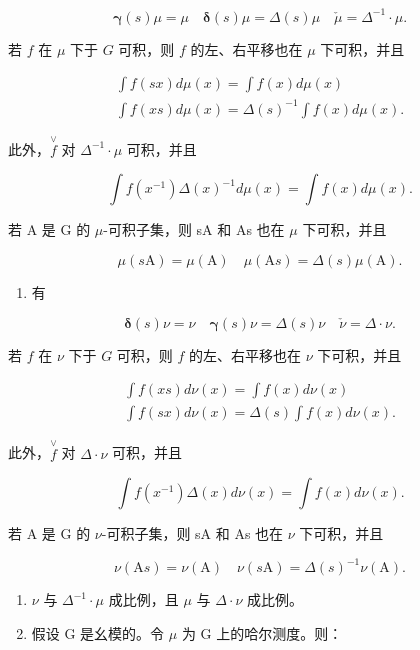 \[
\boldsymbol {\gamma} (s) \mu = \mu \quad \boldsymbol {\delta} (s) \mu = \Delta (s) \mu \quad \check {\mu} = \Delta^ {- 1} \cdot \mu .\tag{20}
\]

若 \(f\) 在 \(\mu\) 下于 \(G\) 可积，则 \(f\) 的左、右平移也在 \(\mu\) 下可积，并且

\[
\begin{array}{l} \int f (s x) d \mu (x) = \int f (x) d \mu (x) \\ \int f (x s) d \mu (x) = \Delta (s) ^ {- 1} \int f (x) d \mu (x). \end{array}\tag{21}
\]

此外，\(\stackrel{\vee}{f}\) 对 \(\Delta^{-1} \cdot \mu\) 可积，并且

\[
\int f (x ^ {- 1}) \Delta (x) ^ {- 1} d \mu (x) = \int f (x) d \mu (x).\tag{22}
\]

若 A 是 G 的 \(\mu\)-可积子集，则 sA 和 As 也在 \(\mu\) 下可积，并且

\[
\mu (s \mathrm{A}) = \mu (\mathrm{A}) \quad \mu (\mathrm{A} s) = \Delta (s) \mu (\mathrm{A}).\tag{23}
\]

\begin{enumerate}
\def\labelenumi{\arabic{enumi})}
\setcounter{enumi}{1}
\tightlist
\item
  有
\end{enumerate}

\[
\boldsymbol {\delta} (s) \nu = \nu \quad \boldsymbol {\gamma} (s) \nu = \Delta (s) \nu \quad \check {\nu} = \Delta \cdot \nu .\tag{24}
\]

若 \(f\) 在 \(\nu\) 下于 \(G\) 可积，则 \(f\) 的左、右平移也在 \(\nu\) 下可积，并且

\[
\begin{array}{l} \int f (x s) d \nu (x) = \int f (x) d \nu (x) \\ \int f (s x) d \nu (x) = \Delta (s) \int f (x) d \nu (x). \end{array}\tag{25}
\]

此外，\(\stackrel{\vee}{f}\) 对 \(\Delta \cdot \nu\) 可积，并且

\[
\int f (x ^ {- 1}) \Delta (x) d \nu (x) = \int f (x) d \nu (x).\tag{26}
\]

若 A 是 G 的 \(\nu\)-可积子集，则 sA 和 As 也在 \(\nu\) 下可积，并且

\[
\nu (\mathrm{A} s) = \nu (\mathrm{A}) \quad \nu (s \mathrm{A}) = \Delta (s) ^ {- 1} \nu (\mathrm{A}).\tag{27}
\]

\begin{enumerate}
\def\labelenumi{\arabic{enumi})}
\setcounter{enumi}{2}
\item
  \(\nu\) 与 \(\Delta^{-1} \cdot \mu\) 成比例，且 \(\mu\) 与 \(\Delta \cdot \nu\) 成比例。
\item
  假设 G 是幺模的。令 \(\mu\) 为 G 上的哈尔测度。则：
\end{enumerate}

